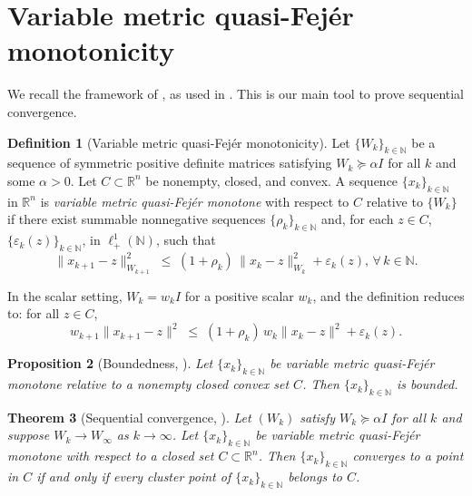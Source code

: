 \documentclass{article}
\theoremstyle{plain}
\newtheorem{theorem}{Theorem}
\newtheorem{proposition}[theorem]{Proposition}
\theoremstyle{definition}
\newtheorem{definition}[theorem]{Definition}
\theoremstyle{remark}
\newcommand{\R}{\mathbb{R}}
\newcommand{\N}{\mathbb{N}}
\newcommand{\norm}[1]{\| #1 \|}
\newcommand{\normW}[2]{\| #1 \|_{#2}}
\begin{document}
\appendix

\section{Variable metric quasi-Fejér monotonicity}

We recall the framework of \citet{combettes2013variable},
as used in \citet{traore2021sequential}. This is our main tool to prove sequential convergence.

\begin{definition}[Variable metric quasi-Fejér monotonicity]
\label{def:fejer}
Let $\{W_k\}_{k \in \N}$ be a sequence of symmetric positive definite
matrices satisfying $W_k \succeq \alpha I$ for all $k$ and some
$\alpha > 0$.
Let $C \subset \R^n$ be nonempty, closed, and convex.
A sequence $\{x_k\}_{k \in \N}$ in $\R^n$ is \emph{variable metric
quasi-Fejér monotone} with respect to $C$ relative to $\{W_k\}$ if
there exist summable nonnegative sequences $\{\rho_k\}_{k \in \N}$ and,
for each $z \in C$, $\{\varepsilon_k(z)\}_{k\in\N}$, in $\ell^1_+(\N)$,
such that
\begin{equation*}
  \normW{x_{k+1} - z}{W_{k+1}}^2
  \;\leq\;
  (1 + \rho_k)\,\normW{x_k - z}{W_k}^2 + \varepsilon_k(z),
  \, \forall\, k \in \N.
\end{equation*}
\end{definition}

In the scalar setting, $W_k = w_k I$ for a positive scalar $w_k$,
and the definition reduces to: for all $z \in C$,
\begin{equation*}
  w_{k+1}\norm{x_{k+1} - z}^2
  \;\leq\;
  (1 + \rho_k)\,w_k\norm{x_k - z}^2 + \varepsilon_k(z).
\end{equation*}

\begin{proposition}[Boundedness, {\cite[Proposition~3.2]{combettes2013variable}}]
\label{prop:bounded}
Let $\{x_k\}_{k\in\N}$ be variable metric quasi-Fejér monotone relative to a
nonempty closed convex set $C$. Then $\{x_k\}_{k\in\N}$ is bounded.
\end{proposition}

\begin{theorem}[Sequential convergence,
{\cite[Theorem~3.3]{combettes2013variable}}]
\label{thm:CV}
Let $(W_k)$ satisfy $W_k \succeq \alpha I$ for all $k$ and suppose
$W_k \to W_\infty$ as $k \to \infty$.
Let $\{x_k\}_{k\in\N}$ be variable metric quasi-Fejér monotone with respect to
a closed set $C \subset \R^n$.
Then $\{x_k\}_{k\in\N}$ converges to a point in $C$ if and only if every cluster
point of $\{x_k\}_{k\in\N}$ belongs to $C$.
\end{theorem}
\end{document}
